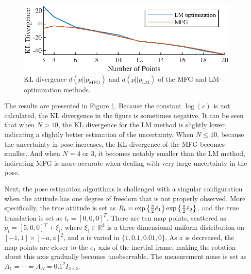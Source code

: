 \begin{figure}
	\centering
	\includegraphics[scale=1.4]{figures/VIO-KL}
	\caption[KL divergence of the MFG and LM-optimization methods.]{KL divergence $d(p||p_\text{MFG})$ and $d(p||p_\text{LM})$ of the MFG and LM-optimization methods.}
	\label{fig:VIO-KL}
\end{figure}

The results are presented in Figure \ref{fig:VIO-KL}.
Because the constant $\log(c)$ is not calculated, the KL divergence in the figure is sometimes negative.
It can be seen that when $N>10$, the KL divergence for the LM method is slightly lower, indicating a slightly better estimation of the uncertainty.
When $N \leq 10$, because the uncertainty in pose increases, the KL-divergence of the MFG becomes smaller.
And when $N=4$ or 3, it becomes notably smaller than the LM method, indicating MFG is more accurate when dealing with very large uncertainty in the pose.

Next, the pose estimation algorithms is challenged with a singular configuration when the attitude has one degree of freedom that is not properly observed.
More specifically, the true attitude is set as $R_t = \exp\left\{ \tfrac{\pi}{2}\hat{e}_1 \right\}\exp\left\{ \tfrac{\pi}{2}\hat{e}_2 \right\}$, and the true translation is set as $t_t = [0,0,0]^T$.
There are ten map points, scattered as $p_i = [5,0,0]^T + \xi_i$, where $\xi_i\in\mathbb{R}^3$ is a three dimensional uniform distribution on $[-1,1] \times [-a,a]^2$, and $a$ is varied in $\{1,0.1,0.01,0\}$.
As $a$ is decreased, the map points are closer to the $e_1$-axis of the inertial frame, making the rotation about this axis gradually becomes unobservable.
The measurement noise is set as $A_1 = \cdots = A_N = 0.1^2I_{3\times 3}$.

